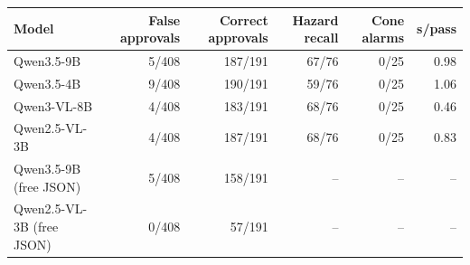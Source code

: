\begin{tabular}{lrrrrr}
\toprule
Model & False approvals & Correct approvals & Hazard recall & Cone alarms & s/pass \\
\midrule
Qwen3.5-9B & 5/408 & 187/191 & 67/76 & 0/25 & 0.98 \\
Qwen3.5-4B & 9/408 & 190/191 & 59/76 & 0/25 & 1.06 \\
Qwen3-VL-8B & 4/408 & 183/191 & 68/76 & 0/25 & 0.46 \\
Qwen2.5-VL-3B & 4/408 & 187/191 & 68/76 & 0/25 & 0.83 \\
Qwen3.5-9B (free JSON) & 5/408 & 158/191 & -- & -- & -- \\
Qwen2.5-VL-3B (free JSON) & 0/408 & 57/191 & -- & -- & -- \\
\bottomrule
\end{tabular}

